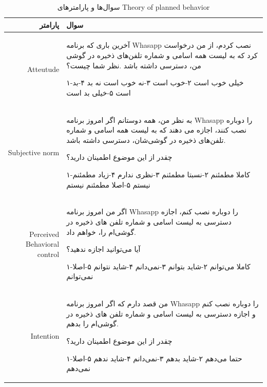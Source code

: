 \begin{table}[ht]
    \caption{سوال‌ها و پارامتر‌های \gls{Theory of planned behavior}}
    \label{tab:TPBquestions}
    \centering
    \onehalfspacing
    \begin{tabularx}{\linewidth}{ r X }
        پارامتر
         &
        سوال
        \\
        \hline
        \gls{Atteutude}
         &
        آخرین باری که برنامه
        \gls{Whasapp}
        نصب کردم، از من درخواست کرد که
        به لیست همه اسامی و شماره تلفن‌های‌ ذخیره
        در گوشی‌ من، دسترسی داشته باشد
        \!.نظر شما چیست؟

        ۱-خیلی خوب است
        ۲-خوب است
        ۳-نه خوب است نه بد
        ۴-بد است
        ۵-خیلی بد است
        \\
        \gls{Subjective norm}
         &

        به نظر من، همه دوستانم اگر امروز برنامه
        \gls{Whasapp}
        را دوباره نصب کنند، اجازه می دهند که
        به لیست همه اسامی و شماره تلفن‌های‌ ذخیره
        در گوشی‌شان، دسترسی داشته باشد.

        چقدر از این موضوع اطمینان دارید؟

        ۱-کاملا مطمئنم
        ۲-نسبتا مطمئنم
        ۳-نظری ندارم
        ۴-زیاد مطمئنم نیستم
        ۵-اصلا مطمئنم نیستم
        \\
        \gls{Perceived Behavioral control}
         &
        اگر من امروز برنامه
        \gls{Whasapp}
        را دوباره نصب کنم، اجازه دسترسی به
        لیست اسامی و شماره تلفن های
        ذخیره در گوشی‌ام را، خواهم داد.

        آیا می‌توانید اجازه ندهید؟

        ۱-کاملا می‌توانم
        ۲-شاید بتوانم
        ۳-نمی‌دانم
        ۴-شاید نتوانم
        ۵-اصلا نمی‌توانم

        \\
        \gls{Intention}
         &
        من قصد دارم که اگر امروز برنامه
        \gls{Whasapp}
        را دوباره نصب کنم و اجازه دسترسی
        به لیست اسامی و شماره تلفن های
        ذخیره در گوشی‌ام را بدهم.

        چقدر از این موضوع اطمینان دارید؟

        ۱-حتما می‌دهم
        ۲-شاید بدهم
        ۳-نمی‌دانم
        ۴-شاید ندهم
        ۵-اصلا نمی‌دهم
        \\
    \end{tabularx}
\end{table}

